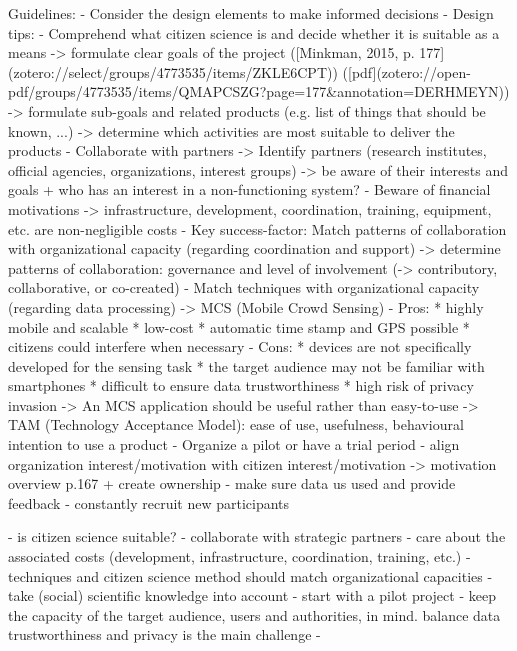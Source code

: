 Guidelines:
- Consider the design elements to make informed decisions
    - Design tips:
        - Comprehend what citizen science is and decide whether it is suitable as a means
            -> formulate clear goals of the project ([Minkman, 2015, p. 177](zotero://select/groups/4773535/items/ZKLE6CPT)) ([pdf](zotero://open-pdf/groups/4773535/items/QMAPCSZG?page=177\&annotation=DERHMEYN))
            -> formulate sub-goals and related products (e.g. list of things that should be known, ...)
            -> determine which activities are most suitable to deliver the products
        - Collaborate with partners
            -> Identify partners (research institutes, official agencies, organizations, interest groups)
            -> be aware of their interests and goals + who has an interest in a non-functioning system?
        - Beware of financial motivations
            -> infrastructure, development, coordination, training, equipment, etc. are non-negligible costs
        - Key success-factor: Match patterns of collaboration with organizational capacity (regarding coordination and support)
            -> determine patterns of collaboration: governance and level of involvement (-> contributory, collaborative, or co-created)
        - Match techniques with organizational capacity (regarding data processing)
            -> MCS (Mobile Crowd Sensing)
                - Pros:
                    * highly mobile and scalable
                    * low-cost
                    * automatic time stamp and GPS possible
                    * citizens could interfere when necessary
                - Cons:
                    * devices are not specifically developed for the sensing task
                    * the target audience may not be familiar with smartphones
                    * difficult to ensure data trustworthiness
                    * high risk of privacy invasion
            -> An MCS application should be useful rather than easy-to-use
                	-> TAM (Technology Acceptance Model): ease of use, usefulness, behavioural intention to use a product
        - Organize a pilot or have a trial period
        - align organization interest/motivation with citizen interest/motivation
            -> motivation overview p.167 + create ownership
        - make sure data us used and provide feedback
        - constantly recruit new participants
 

- is citizen science suitable?
- collaborate with strategic partners
- care about the associated costs (development, infrastructure, coordination, training, etc.)
- techniques and citizen science method should match organizational capacities
- take (social) scientific knowledge into account
- start with a pilot project
- keep the capacity of the target audience, users and authorities, in mind. balance data trustworthiness and privacy is the main challenge
- 

